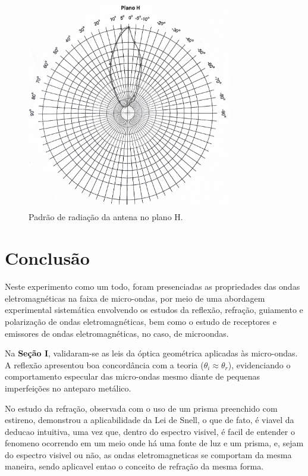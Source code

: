 \documentclass[12pt]{article}
\begin{document}
\begin{figure}[H]
  \centering
  \includegraphics[width=0.8\textwidth]{img/planoh.png}
  \caption{Padrão de radiação da antena no plano H.}
  \label{fig:img/planoh.png}
\end{figure}

\clearpage
\section{Conclusão}
Neste experimento como um todo, foram presenciadas as propriedades das
ondas eletromagnéticas na faixa de micro-ondas, por meio de uma
abordagem experimental sistemática  envolvendo os estudos da
reflexão, refração, guiamento e polarização de ondas
eletromagnéticas, bem como o estudo de receptores e emissores de
ondas eletromagnéticas, no caso, de microondas.

Na \textbf{Seção I}, validaram-se as leis da óptica geométrica
aplicadas às micro-ondas. A reflexão apresentou boa
concordância com a teoria (\(\theta_i \approx \theta_r\)),
evidenciando o comportamento especular das micro-ondas mesmo diante
de pequenas imperfeições no anteparo metálico.

No estudo da refração, observada
com o uso de um prisma preenchido com estireno, demonstrou a
aplicabilidade da Lei de Snell, o que de fato, é viavel da deducao
intuitiva, uma vez que, dentro do espectro visivel, é facil de
entender o fenomeno ocorrendo em um meio onde há uma fonte de luz e
um prisma, e, sejam do espectro visivel ou não, as ondas
eletromagneticas se comportam da mesma maneira, sendo aplicavel entao
o conceito de refração da mesma forma.
\end{document}
